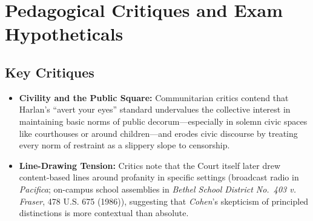 \documentclass[12pt]{article}
\begin{document}
\section{Pedagogical Critiques and Exam Hypotheticals}
\subsection*{Key Critiques}
\begin{itemize}
  \item \textbf{Civility and the Public Square:} Communitarian critics contend that Harlan's ``avert your eyes'' standard undervalues the collective interest in maintaining basic norms of public decorum---especially in solemn civic spaces like courthouses or around children---and erodes civic discourse by treating every norm of restraint as a slippery slope to censorship.
  \item \textbf{Line-Drawing Tension:} Critics note that the Court itself later drew content-based lines around profanity in specific settings (broadcast radio in \textit{Pacifica}; on-campus school assemblies in \textit{Bethel School District No.\ 403 v. Fraser}, 478 U.S. 675 (1986)), suggesting that \textit{Cohen}'s skepticism of principled distinctions is more contextual than absolute.
\end{itemize}
\end{document}
